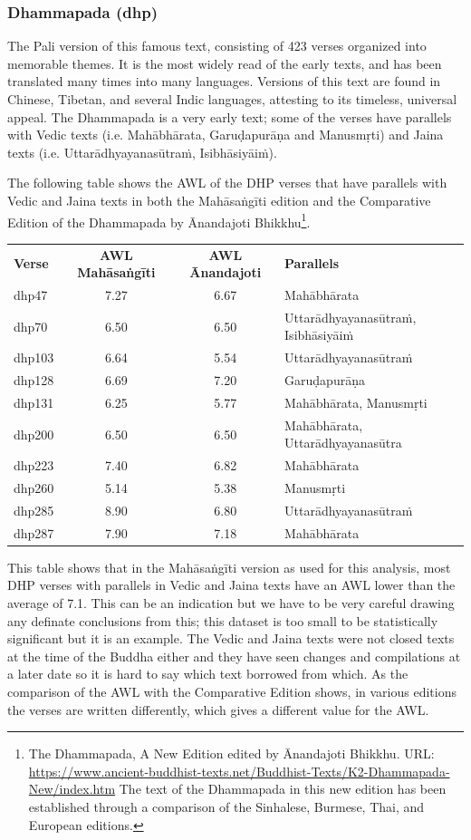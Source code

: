 \subsubsection{Dhammapada (dhp)}
The Pali version of this famous text, consisting of 423 verses organized into memorable themes. It is the most widely read of the early texts, and has been translated many times into many languages. Versions of this text are found in Chinese, Tibetan, and several Indic languages, attesting to its timeless, universal appeal. The Dhammapada is a very early text; some of the verses have parallels with Vedic texts (i.e. Mahābhārata, Garuḍapurāṇa and Manusmṛti) and Jaina texts (i.e. Uttarādhyayanasūtraṁ, Isibhāsiyāiṁ).

The following table shows the AWL of the DHP verses that have parallels with Vedic and Jaina texts in both the Mahāsaṅgīti edition and the Comparative Edition of the Dhammapada by Ānandajoti Bhikkhu\footnote{The Dhammapada, A New Edition edited by Ānandajoti Bhikkhu. URL: \url{https://www.ancient-buddhist-texts.net/Buddhist-Texts/K2-Dhammapada-New/index.htm} The text of the Dhammapada in this new edition has been established through a comparison of the Sinhalese, Burmese, Thai, and European editions.}.\\

\small
\begin{tabular}{ l c c l }
\textbf{Verse} & \textbf{AWL Mahāsaṅgīti} & \textbf{AWL Ānandajoti} & \textbf{Parallels} \\
dhp47 & 7.27 & 6.67 & Mahābhārata \\
dhp70 & 6.50 & 6.50 & Uttarādhyayanasūtraṁ, Isibhāsiyāiṁ \\
dhp103 & 6.64 & 5.54 & Uttarādhyayanasūtraṁ \\
dhp128 & 6.69 & 7.20 & Garuḍapurāṇa \\
dhp131 & 6.25 & 5.77 & Mahābhārata, Manusmṛti \\
dhp200 & 6.50 & 6.50 & Mahābhārata, Uttarādhyayanasūtra \\
dhp223 & 7.40 & 6.82 & Mahābhārata \\
dhp260 & 5.14 & 5.38 & Manusmṛti \\
dhp285 & 8.90 & 6.80 & Uttarādhyayanasūtraṁ \\
dhp287 & 7.90 & 7.18 & Mahābhārata
\end{tabular}

\normalsize
\medskip
This table shows that in the Mahāsaṅgīti version as used for this analysis, most DHP verses with parallels in Vedic and Jaina texts have an AWL lower than the average of 7.1. This can be an indication but we have to be very careful drawing any definate conclusions from this; this dataset is too small to be statistically significant but it is an example. The Vedic and Jaina texts were not closed texts at the time of the Buddha either and they have seen changes and compilations at a later date so it is hard to say which text borrowed from which. As the comparison of the AWL with the Comparative Edition shows, in various editions the verses are written differently, which gives a different value for the AWL.

